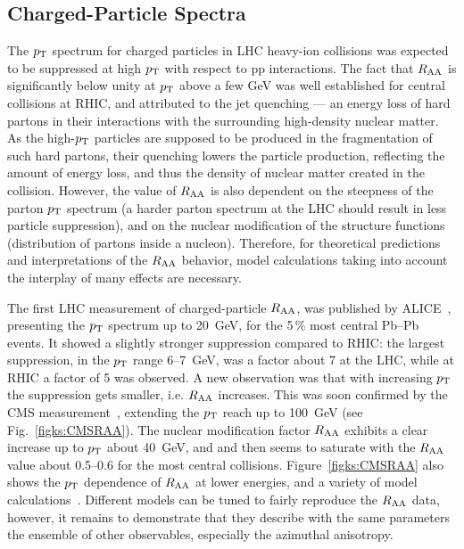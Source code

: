 \subsection{Charged-Particle Spectra}
\label{subsecks:transspectra}
The $p_{\rm T}$ spectrum for charged particles in LHC heavy-ion collisions was expected to be suppressed at high $p_{\rm T}$ with respect to pp interactions. The fact that $R_{\rm AA}$ is significantly below unity at $p_{\rm T}$ above a few GeV was well established for central collisions at RHIC, and attributed to the jet quenching --- an energy loss of hard partons in their interactions with the surrounding high-density nuclear matter. As the high-$p_{\rm T}$ particles are supposed to be produced in the fragmentation of such hard partons, their quenching lowers the particle production, reflecting the amount of energy loss, and thus the density of nuclear matter created in the collision. However, the value of $R_{\rm AA}$ is also dependent on the steepness of the parton $p_{\rm T}$ spectrum (a harder parton spectrum at the LHC should result in less particle suppression), and on the nuclear modification of the structure functions (distribution of partons inside a nucleon). Therefore, for theoretical predictions and interpretations of the $R_{\rm AA}$ behavior, model calculations taking into account the interplay of many effects are necessary.

The first LHC measurement of charged-particle $R_{\rm AA}$, was published by ALICE~\cite{Aamodt:2010jd}, presenting the $p_{\rm T}$ spectrum up to 20~GeV, for the 5\,\% most central Pb--Pb events. It showed a slightly stronger suppression compared to RHIC: the largest suppression, in the $p_{\rm T}$ range 6--7~GeV, was a factor about 7 at the LHC, while at RHIC a factor of 5 was observed. A new observation was that with increasing $p_{\rm T}$ the suppression gets smaller, i.e. $R_{\rm AA}$ increases. This was soon confirmed by the CMS measurement~\cite{CMS:2012aa}, extending the $p_{\rm T}$ reach up to 100~GeV (see Fig.~\ref{figks:CMSRAA}). The nuclear modification factor $R_{\rm AA}$ exhibits a clear increase up to $p_{\rm T}$ about 40~GeV, and and then seems to saturate with the $R_{\rm AA}$ value about 0.5--0.6 for the most central collisions. Figure~\ref{figks:CMSRAA} also shows the $p_{\rm T}$ dependence of $R_{\rm AA}$ at lower energies, and a variety of model calculations~\cite{Dainese:2004te,Vitev:2002pf,Vitev:2004bh,Salgado:2003gb,Armesto:2005iq,Renk:2011gj}. Different models can be tuned to fairly reproduce the $R_{\rm AA}$ data, however, it remains to demonstrate that they describe with the same parameters the ensemble of other observables, especially the azimuthal anisotropy.

